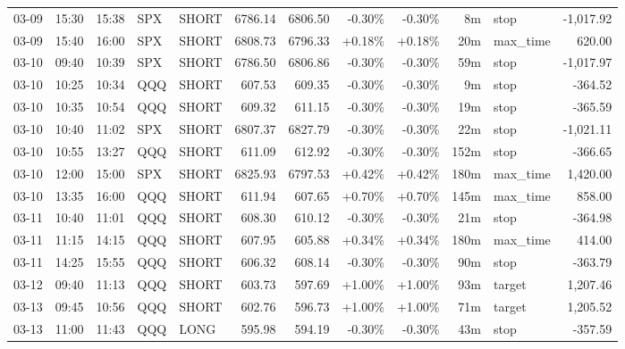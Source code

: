 \documentclass[11pt,a4paper,twoside]{article}
\begin{document}
\begin{center}
\begin{longtable}{>{\color{txtmain}}l l l l l r r r r r >{\color{txtmain}}l r}
03-09 & 15:30 & 15:38 & SPX & SHORT & 6786.14 & 6806.50 & \textcolor{lossred}{-0.30\%} & \textcolor{lossred}{-0.30\%} & 8m & stop & \textcolor{lossred}{-1,017.92} \\
03-09 & 15:40 & 16:00 & SPX & SHORT & 6808.73 & 6796.33 & \textcolor{wingreen}{+0.18\%} & \textcolor{wingreen}{+0.18\%} & 20m & max\_time & \textcolor{wingreen}{620.00} \\
03-10 & 09:40 & 10:39 & SPX & SHORT & 6786.50 & 6806.86 & \textcolor{lossred}{-0.30\%} & \textcolor{lossred}{-0.30\%} & 59m & stop & \textcolor{lossred}{-1,017.97} \\
03-10 & 10:25 & 10:34 & QQQ & SHORT & 607.53 & 609.35 & \textcolor{lossred}{-0.30\%} & \textcolor{lossred}{-0.30\%} & 9m & stop & \textcolor{lossred}{-364.52} \\
03-10 & 10:35 & 10:54 & QQQ & SHORT & 609.32 & 611.15 & \textcolor{lossred}{-0.30\%} & \textcolor{lossred}{-0.30\%} & 19m & stop & \textcolor{lossred}{-365.59} \\
03-10 & 10:40 & 11:02 & SPX & SHORT & 6807.37 & 6827.79 & \textcolor{lossred}{-0.30\%} & \textcolor{lossred}{-0.30\%} & 22m & stop & \textcolor{lossred}{-1,021.11} \\
03-10 & 10:55 & 13:27 & QQQ & SHORT & 611.09 & 612.92 & \textcolor{lossred}{-0.30\%} & \textcolor{lossred}{-0.30\%} & 152m & stop & \textcolor{lossred}{-366.65} \\
03-10 & 12:00 & 15:00 & SPX & SHORT & 6825.93 & 6797.53 & \textcolor{wingreen}{+0.42\%} & \textcolor{wingreen}{+0.42\%} & 180m & max\_time & \textcolor{wingreen}{1,420.00} \\
03-10 & 13:35 & 16:00 & QQQ & SHORT & 611.94 & 607.65 & \textcolor{wingreen}{+0.70\%} & \textcolor{wingreen}{+0.70\%} & 145m & max\_time & \textcolor{wingreen}{858.00} \\
03-11 & 10:40 & 11:01 & QQQ & SHORT & 608.30 & 610.12 & \textcolor{lossred}{-0.30\%} & \textcolor{lossred}{-0.30\%} & 21m & stop & \textcolor{lossred}{-364.98} \\
03-11 & 11:15 & 14:15 & QQQ & SHORT & 607.95 & 605.88 & \textcolor{wingreen}{+0.34\%} & \textcolor{wingreen}{+0.34\%} & 180m & max\_time & \textcolor{wingreen}{414.00} \\
03-11 & 14:25 & 15:55 & QQQ & SHORT & 606.32 & 608.14 & \textcolor{lossred}{-0.30\%} & \textcolor{lossred}{-0.30\%} & 90m & stop & \textcolor{lossred}{-363.79} \\
03-12 & 09:40 & 11:13 & QQQ & SHORT & 603.73 & 597.69 & \textcolor{wingreen}{+1.00\%} & \textcolor{wingreen}{+1.00\%} & 93m & target & \textcolor{wingreen}{1,207.46} \\
03-13 & 09:45 & 10:56 & QQQ & SHORT & 602.76 & 596.73 & \textcolor{wingreen}{+1.00\%} & \textcolor{wingreen}{+1.00\%} & 71m & target & \textcolor{wingreen}{1,205.52} \\
03-13 & 11:00 & 11:43 & QQQ & LONG & 595.98 & 594.19 & \textcolor{lossred}{-0.30\%} & \textcolor{lossred}{-0.30\%} & 43m & stop & \textcolor{lossred}{-357.59} \\
\end{longtable}
\end{center}
\clearpage
\end{document}
